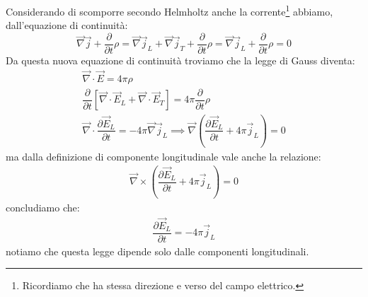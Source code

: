 Considerando di scomporre secondo Helmholtz anche la corrente\footnote{Ricordiamo che ha stessa direzione e verso del campo elettrico.} abbiamo, dall'equazione di continuità:
\begin{equation*}
     \Vec{\nabla}\Vec{j}+\dfrac{\partial}{\partial t} \rho= \Vec{\nabla}\Vec{j}_L+\Vec{\nabla}\Vec{j}_T+\dfrac{\partial}{\partial t} \rho= \Vec{\nabla}\Vec{j}_L+\dfrac{\partial}{\partial t} \rho=0
\end{equation*}
Da questa nuova equazione di continuità troviamo che la legge di Gauss diventa:
\begin{equation*}
\begin{gathered}
    \Vec{\nabla}\cdot\Vec{E}=4\pi\rho\\
    \dfrac{\partial}{\partial t}  [\Vec{\nabla}\cdot\Vec{E}_L+\Vec{\nabla}\cdot\Vec{E}_T]=4\pi\dfrac{\partial}{\partial t} \rho\\
    \Vec{\nabla}\cdot\dfrac{\partial\Vec{E}_L}{\partial t} =-4\pi\Vec{\nabla}\Vec{j}_L \implies  \Vec{\nabla}(\dfrac{\partial\Vec{E}_L}{\partial t} +4\pi\Vec{j}_L)=0
\end{gathered}
\end{equation*}
ma dalla definizione di componente longitudinale vale anche la relazione:
\begin{equation*}
\begin{gathered}
   \Vec{\nabla}\times(\dfrac{\partial\Vec{E}_L}{\partial t} +4\pi\Vec{j}_L)=0
\end{gathered}
\end{equation*}
concludiamo che:
\begin{equation*}
\begin{gathered}
\dfrac{\partial\Vec{E}_L}{\partial t} =-4\pi\Vec{j}_L
\end{gathered}
\end{equation*}
notiamo che questa legge dipende solo dalle componenti longitudinali.

